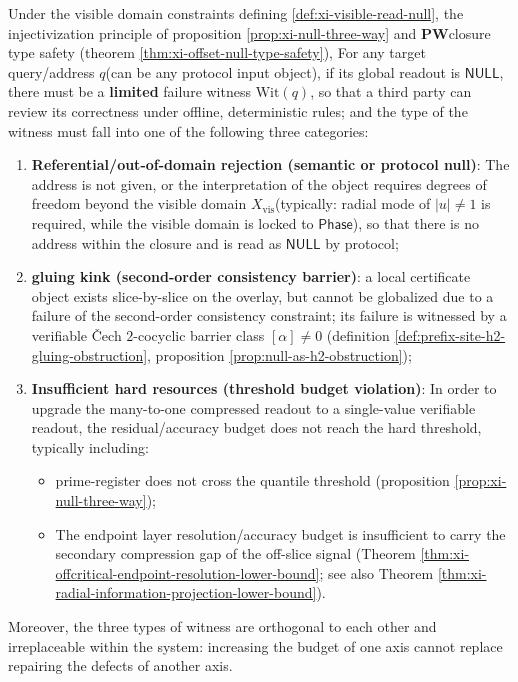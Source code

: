 \begin{theorem}\label{thm:xi-null-complete-trichotomy-offline}
Under the visible domain constraints defining \ref{def:xi-visible-read-null}, the injectivization principle of proposition \ref{prop:xi-null-three-way} and \(\mathbf{PW}\) ​​closure type safety (theorem \ref{thm:xi-offset-null-type-safety}),
For any target query/address \(q\) ​​(can be any protocol input object), if its global readout is \(\mathsf{NULL}\), there must be a \textbf{limited} failure witness \(\mathrm{Wit}(q)\), so that a third party can review its correctness under offline, deterministic rules; and the type of the witness must fall into one of the following three categories:
\begin{enumerate}
  \item \textbf{Referential/out-of-domain rejection (semantic or protocol null)}: The address is not given, or the interpretation of the object requires degrees of freedom beyond the visible domain \(X_{\mathrm{vis}}\) ​​(typically: radial mode of \(|u|\neq 1\) is required, while the visible domain is locked to \(\mathsf{Phase}\)), so that there is no address within the closure and is read as \(\mathsf{NULL}\) by protocol;
  \item \textbf{gluing kink (second-order consistency barrier)}: a local certificate object exists slice-by-slice on the overlay, but cannot be globalized due to a failure of the second-order consistency constraint; its failure is witnessed by a verifiable Čech \(2\)-cocyclic barrier class \([\alpha]\neq 0\) (definition \ref{def:prefix-site-h2-gluing-obstruction}, proposition \ref{prop:null-as-h2-obstruction});
  \item ​​\textbf{Insufficient hard resources (threshold budget violation)}: In order to upgrade the many-to-one compressed readout to a single-value verifiable readout, the residual/accuracy budget does not reach the hard threshold, typically including:
  \begin{itemize}
    The modular product budget of \item prime-register does not cross the quantile threshold (proposition \ref{prop:xi-null-three-way});
    \item The endpoint layer resolution/accuracy budget is insufficient to carry the secondary compression gap of the off-slice signal (Theorem \ref{thm:xi-offcritical-endpoint-resolution-lower-bound}; see also Theorem \ref{thm:xi-radial-information-projection-lower-bound}).
  \end{itemize}
\end{enumerate}
Moreover, the three types of witness are orthogonal to each other and irreplaceable within the system: increasing the budget of one axis cannot replace repairing the defects of another axis.
\end{theorem}


